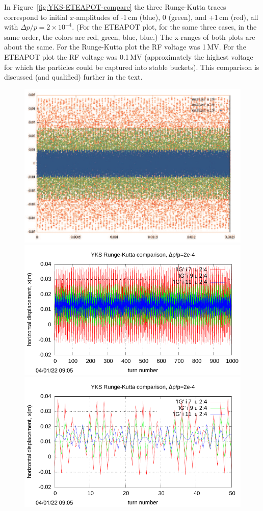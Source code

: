 \documentclass[12]{article}
\begin{document}
In Figure~\ref{fig:YKS-ETEAPOT-compare}
the three Runge-Kutta traces correspond
to initial $x$-amplitudes of -1\,cm (blue), 0 (green), and 
+1\,cm (red), all with $\Delta p/p=2\times10^{-4}$. 
(For the ETEAPOT plot, for the same three cases, in the same order, the 
colors are red, green, blue, blue.)
The x-ranges 
of both plots are about the same. For the Runge-Kutta plot
the RF voltage was 1\,MV. For the
ETEAPOT plot the RF voltage was 0.1\,MV
(approximately the highest voltage for which the
particles could be captured into stable buckets). This
comparison is discussed (and qualified) further in the text.
\begin{figure}[hbt]
\centering
\includegraphics[scale=0.4]{pdf/Yannis-RungeKutta.pdf}\\
\includegraphics[scale=0.7]{pdf/BM-IV_Figure5r.pdf}
\includegraphics[scale=0.7]{pdf/BM-IV_Figure5r-early.pdf}

\end{figure}
\end{document}
